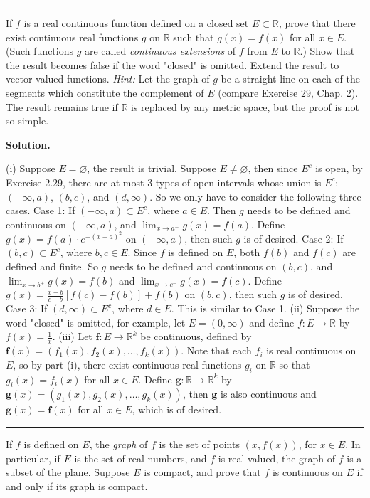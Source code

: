\documentclass[12pt]{article}
\theoremstyle{definition}
\begin{document}
\bigskip\noindent\hrule\bigskip

If $f$ is a real continuous function defined on a closed set $E\subset \mathbb{R}$, prove that there exist continuous real functions $g$ on $\mathbb{R}$ such that $g(x)=f(x)$ for all $x\in E$. (Such functions $g$ are called \textit{continuous extensions} of $f$ from $E$ to $\mathbb{R}$.) Show that the result becomes false if the word "closed" is omitted. Extend the result to vector-valued functions. \textit{Hint:} Let the graph of $g$ be a straight line on each of the segments which constitute the complement of $E$ (compare Exercise 29, Chap. 2). The result remains true if $\mathbb{R}$ is replaced by any metric space, but the proof is not so simple.

\smallskip
\noindent\textbf{Solution.}\quad

(i) Suppose $E=\varnothing$, the result is trivial. Suppose $E\ne\varnothing$, then since $E^c$ is open, by Exercise 2.29, there are at most 3 types of open intervals whose union is $E^c$: $(-\infty,a)$, $(b,c)$, and $(d,\infty)$. So we only have to consider the following three cases.
Case 1: If $(-\infty,a)\subset E^c$, where $a\in E$. Then $g$ needs to be defined and continuous on $(-\infty,a)$, and $\lim_{x\to a^-}g(x)=f(a)$. Define $g(x)=f(a)\cdot e^{-(x-a)^2}$ on $(-\infty,a)$, then such $g$ is of desired.
Case 2: If $(b,c)\subset E^c$, where $b,c\in E$. Since $f$ is defined on $E$, both $f(b)$ and $f(c)$ are defined and finite. So $g$ needs to be defined and continuous on $(b,c)$, and $\lim_{x\to b^+}g(x)=f(b)$ and $\lim_{x\to c^-}g(x)=f(c)$. Define $g(x)=\frac{x-b}{c-b}\left[f(c)-f(b)\right]+f(b)$ on $(b,c)$, then such $g$ is of desired.
Case 3: If $(d,\infty)\subset E^c$, where $d\in E$. This is similar to Case 1.
(ii) Suppose the word "closed" is omitted, for example, let $E=(0,\infty)$ and define $f:E\to \mathbb{R}$ by $f(x)=\frac{1}{x}$.
(iii) Let $\mathbf{f}:E\to \mathbb{R}^k$ be continuous, defined by $\mathbf{f}(x)=(f_1(x),f_2(x),\ldots,f_k(x))$. Note that each $f_i$ is real continuous on $E$, so by part (i), there exist continuous real functions $g_i$ on $\mathbb{R}$ so that $g_i(x)=f_i(x)$ for all $x\in E$. Define $\mathbf{g}:\mathbb{R}\to \mathbb{R}^k$ by $\mathbf{g}(x)=(g_1(x),g_2(x),\ldots,g_k(x))$, then $\mathbf{g}$ is also continuous and $\mathbf{g}(x)=\mathbf{f}(x)$ for all $x\in E$, which is of desired.



\bigskip\noindent\hrule\bigskip

If $f$ is defined on $E$, the \textit{graph} of $f$ is the set of points $(x,f(x))$, for $x\in E$. In particular, if $E$ is the set of real numbers, and $f$ is real-valued, the graph of $f$ is a subset of the plane.
Suppose $E$ is compact, and prove that $f$ is continuous on $E$ if and only if its graph is compact.
\end{document}
